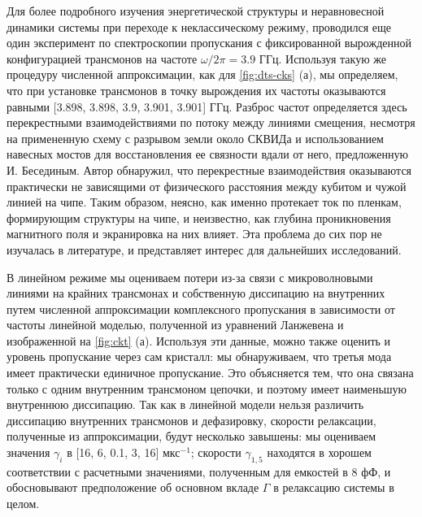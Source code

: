 \documentclass[14pt, a4paper]{extreport}
\numberwithin{equation}{section}
\begin{document}
Для более подробного изучения энергетической структуры и неравновесной динамики системы при переходе к неклассическому режиму, проводился еще один эксперимент по спектроскопии пропускания с фиксированной вырожденной конфигурацией трансмонов на частоте $\omega/2\pi = 3.9$ ГГц. Используя такую же процедуру численной аппроксимации, как для \autoref{fig:dts-cks} (а), мы определяем, что при установке трансмонов в точку вырождения их частоты оказываются равными [3.898, 3.898, 3.9, 3.901, 3.901] ГГц. Разброс частот определяется здесь перекрестными взаимодействиями по потоку между линиями смещения, несмотря на примененную схему с разрывом земли около СКВИДа и использованием навесных мостов для восстановления ее связности вдали от него, предложенную И. Бесединым. Автор обнаружил, что перекрестные взаимодействия оказываются практически не зависящими от физического расстояния между кубитом и чужой линией на чипе. Таким образом, неясно, как именно протекает ток по пленкам, формирующим структуры на чипе, и неизвестно, как глубина проникновения магнитного поля и экранировка на них влияет. Эта проблема до сих пор не изучалась в литературе, и представляет интерес для дальнейших исследований.

В линейном режиме мы оцениваем потери из-за связи с микроволновыми линиями на крайних трансмонах и собственную диссипацию на внутренних путем численной аппроксимации комплексного пропускания в зависимости от частоты линейной моделью, полученной из уравнений Ланжевена и изображенной на \autoref{fig:ckt} (а). Используя эти данные, можно также оценить и уровень пропускание через сам кристалл: мы обнаруживаем, что третья мода имеет практически единичное пропускание. Это объясняется тем, что она связана только с одним внутренним трансмоном цепочки, и поэтому имеет наименьшую внутреннюю диссипацию. Так как в линейной модели нельзя различить диссипацию внутренних трансмонов и дефазировку, скорости релаксации, полученные из аппроксимации, будут несколько завышены: мы оцениваем значения $\gamma_i$ в [16, 6, 0.1,  3, 16] $\text{мкс}^{-1}$; скорости $\gamma_{1,5}$ находятся в хорошем соответствии с расчетными значениями, полученным для емкостей в 8 фФ, и обосновывают предположение об основном вкладе $\Gamma$ в релаксацию системы в целом.
\end{document}
